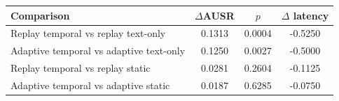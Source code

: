 \begin{tabular}{lccc}
\toprule
Comparison & $\Delta$AUSR & $p$ & $\Delta$ latency \\
\midrule
Replay temporal vs replay text-only & 0.1313 & 0.0004 & -0.5250 \\
Adaptive temporal vs adaptive text-only & 0.1250 & 0.0027 & -0.5000 \\
Replay temporal vs replay static & 0.0281 & 0.2604 & -0.1125 \\
Adaptive temporal vs adaptive static & 0.0187 & 0.6285 & -0.0750 \\
\bottomrule
\end{tabular}
